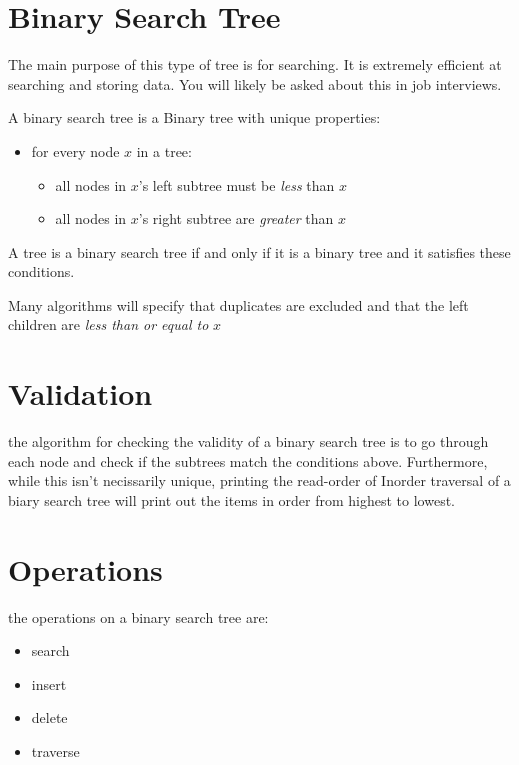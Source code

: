 \documentclass[12pt]{book}
\title{\coursetitle\linebreak\lecturename}
\author{\\Cain Susko\\ 
           \\ \\ \\
      Queen's University 
    \\School of Computing\\}
\begin{document}
\begin{titlepage}
        \maketitle
\end{titlepage}


\section*{Binary Search Tree}
The main purpose of this type of tree is for searching.
It is extremely efficient at searching and storing data.
You will likely be asked about this in job interviews.

A binary search tree is a Binary tree with unique properties:
\begin{itemize}
        \item for every node $x$ in a tree:
         \begin{itemize}
                \item all nodes in $x$'s left subtree must be \textit{less} than $x$
                \item all nodes in $x$'s right subtree are \textit{greater} than $x$
        \end{itemize}
\end{itemize}

A tree is a binary search tree if and only if it is a binary tree and it satisfies these conditions.

Many algorithms will specify that duplicates are excluded and that the left children are \textit{less than or equal to }$x$ 

\section*{Validation}
the algorithm for checking the validity of a binary search tree is to go through each node and check if the subtrees match the
        conditions above.
Furthermore, while this isn't necissarily unique, printing the read-order of Inorder traversal of a biary search tree will
        print out the items in order from highest to lowest.

\section*{Operations}
the operations on a binary search tree are:
\begin{itemize}
        \item search
        \item insert
        \item delete
        \item traverse
\end{itemize}
\end{document}
